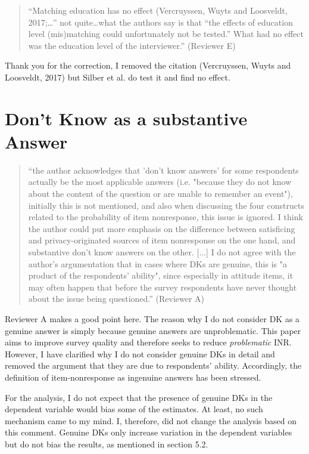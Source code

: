 \documentclass[a4paper, 12pt]{article}
\begin{document}
\begin{quotation}
“Matching education has no effect (Vercruyssen, Wuyts and Loosveldt, 2017;…” not quite…what the authors say is that “the effects of education level (mis)matching could unfortunately not be tested.” What had no effect was the education level of the interviewer.'' (Reviewer E)
\end{quotation}

Thank you for the correction, I removed the citation (Vercruyssen, Wuyts and Loosveldt, 2017) but Silber et al. do test it and find no effect.


\section{Don't Know as a substantive Answer}

\begin{quotation}
``the author acknowledges that 'don't know answers' for some respondents actually be the most applicable answers (i.e. "because they do not know about the content of the question or are unable to remember an event"), initially this is not mentioned, and also when discussing the four constructs related to the probability of item nonresponse, this issue is ignored. I think the author could put more emphasis on the difference between satisficing and privacy-originated sources of item nonresponse on the one hand, and substantive don't know answers on the other. [...] I do not agree with the author's argumentation that in cases where DKs are genuine, this is "a product of the respondents' ability", since especially in attitude items, it may often happen that before the survey respondents have never thought about the issue being questioned.'' (Reviewer A)
\end{quotation}

Reviewer A makes a good point here. The reason why I do not consider DK as a genuine answer is simply because genuine answers are unproblematic. This paper aims to improve survey quality and therefore seeks to reduce \textit{problematic} INR. However, I have clarified why I do not consider genuine DKs in detail and removed the argument that they are due to respondents' ability. Accordingly, the definition of item-nonresponse as ingenuine answers has been stressed.

For the analysis, I do not expect that the presence of genuine DKs in the dependent variable would bias some of the estimates. At least, no such mechanism came to my mind. I, therefore, did not change the analysis based on this comment. Genuine DKs only increase variation in the dependent variables but do not bias the results, as mentioned in section 5.2.
\end{document}
